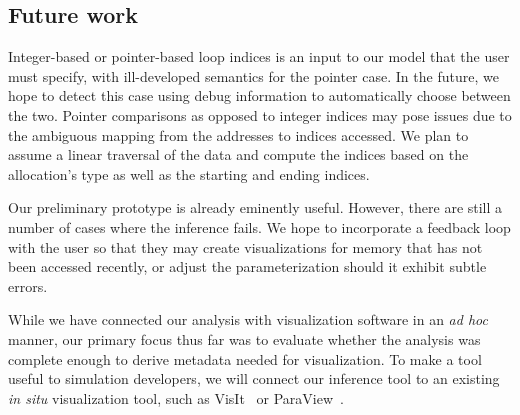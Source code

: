\subsection{Future work}

Integer-based or pointer-based loop indices is an input to our model
that the user must specify, with ill-developed semantics for the
pointer case.  In the future, we hope to detect this case using
debug information to automatically choose between the two.  Pointer
comparisons as opposed to integer indices may pose issues due to the
ambiguous mapping from the addresses to indices accessed.  We plan to
assume a linear traversal of the data and compute the indices based on
the allocation's type as well as the starting and ending indices.

Our preliminary prototype is already eminently useful.  However, there
are still a number of cases where the inference fails.  We hope to
incorporate a feedback loop with the user so that they may create
visualizations for memory that has not been accessed recently, or
adjust the parameterization should it exhibit subtle errors.

While we have connected our analysis with visualization software in an
\textit{ad hoc} manner, our primary focus thus far was to evaluate
whether the analysis was complete enough to derive metadata needed for
visualization.  To make a tool useful to simulation developers, we will
connect our inference tool to an existing \textit{in situ}
visualization tool, such as VisIt~\cite{Childs:2012:VisIt} or
ParaView~\cite{Fabian:2011:Catalyst}.
